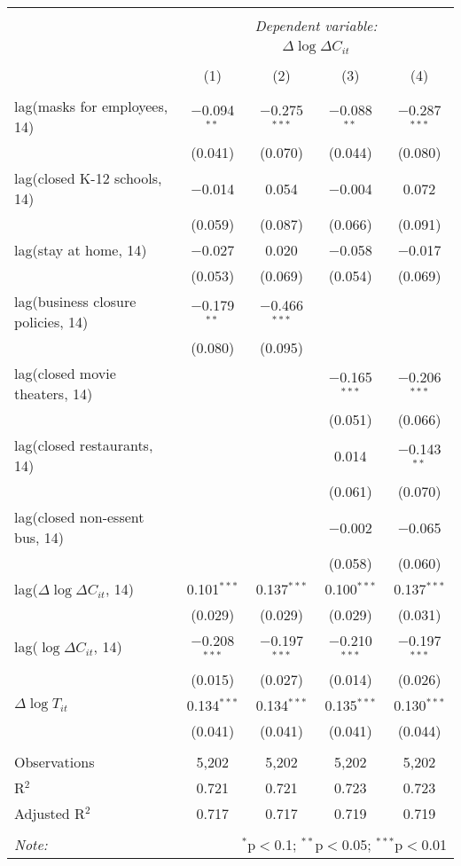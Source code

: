 \begin{tabular}{@{\extracolsep{1pt}}lcccc} 
\\[-1.8ex]\hline 
\hline \\[-1.8ex] 
 & \multicolumn{4}{c}{\textit{Dependent variable:}} \\ 
\cline{2-5} 
 & \multicolumn{4}{c}{$\Delta \log \Delta C_{it}$} \\ 
\\[-1.8ex] & (1) & (2) & (3) & (4)\\ 
\hline \\[-1.8ex] 
 lag(masks for employees, 14) & $-$0.094$^{**}$ & $-$0.275$^{***}$ & $-$0.088$^{**}$ & $-$0.287$^{***}$ \\ 
  & (0.041) & (0.070) & (0.044) & (0.080) \\ 
  lag(closed K-12 schools, 14) & $-$0.014 & 0.054 & $-$0.004 & 0.072 \\ 
  & (0.059) & (0.087) & (0.066) & (0.091) \\ 
  lag(stay at home, 14) & $-$0.027 & 0.020 & $-$0.058 & $-$0.017 \\ 
  & (0.053) & (0.069) & (0.054) & (0.069) \\ 
  lag(business closure policies, 14) & $-$0.179$^{**}$ & $-$0.466$^{***}$ &  &  \\ 
  & (0.080) & (0.095) &  &  \\ 
  lag(closed movie theaters, 14) &  &  & $-$0.165$^{***}$ & $-$0.206$^{***}$ \\ 
  &  &  & (0.051) & (0.066) \\ 
  lag(closed restaurants, 14) &  &  & 0.014 & $-$0.143$^{**}$ \\ 
  &  &  & (0.061) & (0.070) \\ 
  lag(closed non-essent bus, 14) &  &  & $-$0.002 & $-$0.065 \\ 
  &  &  & (0.058) & (0.060) \\ 
  lag($\Delta \log \Delta C_{it}$, 14) & 0.101$^{***}$ & 0.137$^{***}$ & 0.100$^{***}$ & 0.137$^{***}$ \\ 
  & (0.029) & (0.029) & (0.029) & (0.031) \\ 
  lag($\log \Delta C_{it}$, 14) & $-$0.208$^{***}$ & $-$0.197$^{***}$ & $-$0.210$^{***}$ & $-$0.197$^{***}$ \\ 
  & (0.015) & (0.027) & (0.014) & (0.026) \\ 
  $\Delta \log T_{it}$ & 0.134$^{***}$ & 0.134$^{***}$ & 0.135$^{***}$ & 0.130$^{***}$ \\ 
  & (0.041) & (0.041) & (0.041) & (0.044) \\ 
 \hline \\[-1.8ex] 
Observations & 5,202 & 5,202 & 5,202 & 5,202 \\ 
R$^{2}$ & 0.721 & 0.721 & 0.723 & 0.723 \\ 
Adjusted R$^{2}$ & 0.717 & 0.717 & 0.719 & 0.719 \\ 
\hline 
\hline \\[-1.8ex] 
\textit{Note:}  & \multicolumn{4}{r}{$^{*}$p$<$0.1; $^{**}$p$<$0.05; $^{***}$p$<$0.01} \\ 
\end{tabular} 